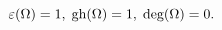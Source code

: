 \begin{equation}
\varepsilon(\Omega)=1,\;\hbox{gh}(\Omega)=1,\;\hbox{deg}
(\Omega)=0.\label{3.20}%
\end{equation}

